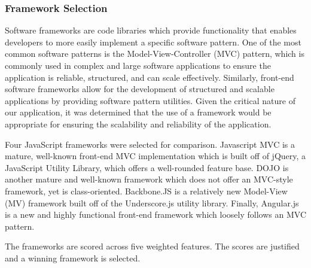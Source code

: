 \documentclass{report}
\begin{document}
\subsubsection{Framework Selection}

Software frameworks are code libraries which provide functionality that enables developers to more easily implement a specific software pattern. One of the most common software patterns is the Model-View-Controller (MVC) pattern, which is commonly used in complex and large software applications to ensure the application is reliable, structured, and can scale effectively. Similarly, front-end software frameworks allow for the development of structured and scalable applications by providing software pattern utilities. Given the critical nature of our application, it was determined that the use of a framework would be appropriate for ensuring the scalability and reliability of the application.

Four JavaScript frameworks were selected for comparison. Javascript MVC is a mature, well-known front-end MVC implementation which is built off of jQuery, a JavaScript Utility Library, which offers a well-rounded feature base. DOJO is another mature and well-known framework which does not offer an MVC-style framework, yet is class-oriented. Backbone.JS is a relatively new Model-View (MV) framework built off of the Underscore.js utility library. Finally, Angular.js is a new and highly functional front-end framework which loosely follows an MVC pattern.

The frameworks are scored across five weighted features. The scores are justified and a winning framework is selected.
\end{document}
